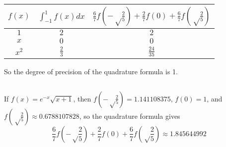 \documentclass[11pt]{article}
\begin{document}
\section{} %
\subsection{} %
\begin{tabular}{c|c|c}
	$f(x)$ & $\int_{-1}^{1}f(x)dx$ & $\frac{6}{7}f\left(-\sqrt\frac{2}{5}\right)+\frac{2}{7}f(0)+\frac{6}{7}f\left(\sqrt\frac{2}{5}\right)$ \\
	\hline
	$1$ & $2$ & $2$ \\
	$x$ & $0$ & $0$ \\
	$x^2$ & $\frac{2}{3}$ & $\frac{24}{35}$ \\
\end{tabular}
So the degree of precision of the quadrature formula is 1.


\subsection{} %
If $f(x)=e^{-x}\sqrt{x+1}$, then
$f\left(-\sqrt\frac{2}{5}\right)=1.141108375$, $f(0)=1$, and
$f\left(\sqrt\frac{2}{5}\right)\approx0.6788107828$, so the quadrature formula
gives
\[\frac{6}{7}f\left(-\sqrt\frac{2}{5}\right)+\frac{2}{7}f(0)+\frac{6}{7}f\left(\sqrt\frac{2}{5}\right)\approx1.845644992\]


\section{} %
\subsection{} %


\subsection{} %

\end{document}
